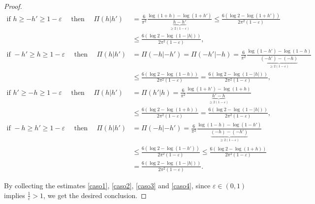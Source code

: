\documentclass[a4paper,10pt,reqno]{amsart}
\numberwithin{equation}{subsection}
\numberwithin{figure}{subsection}
\begin{document}
\begin{proof}
{\scriptsize\begin{align*}
\textrm{if }h\geq-h'\geq1-\varepsilon\quad\textrm{ then }\quad\Pi(h|h')&=\frac{6}{\pi^2}\frac{\log(1+h)-\log(1+h')}{\underbrace{h-h'}_{\geq2(1-\varepsilon)}}\leq\frac{6(\log 2-\log(1+h'))}{2\pi^2(1-\varepsilon)}
\\
&\leq\frac{6(\log 2-\log(1-|h|))}{2\pi^2(1-\varepsilon)},
\\
\textrm{if }-h'\geq h\geq1-\varepsilon\quad\textrm{ then }\quad\Pi(h|h')&=\Pi(-h|-h')=\Pi(-h'|-h)=\frac{6}{\pi^2}\frac{\log(1-h')-\log(1-h)}{\underbrace{(-h')-(-h)}_{\geq2(1-\varepsilon)}}
\\
&\leq\frac{6(\log 2-\log(1-h))}{2\pi^2(1-\varepsilon)}=\frac{6(\log 2-\log(1-|h|))}{2\pi^2(1-\varepsilon)},
\\
\textrm{if }h'\geq-h\geq1-\varepsilon\quad\textrm{ then }\quad\Pi(h|h')&=\Pi(h'|h)=\frac{6}{\pi^2}\frac{\log(1+h')-\log(1+h)}{\underbrace{h'-h}_{\geq2(1-\varepsilon)}}
\\
&\leq\frac{6(\log 2-\log(1+h))}{2\pi^2(1-\varepsilon)}=\frac{6(\log 2-\log(1-|h|))}{2\pi^2(1-\varepsilon)},
\\
\textrm{if }-h\geq h'\geq1-\varepsilon\quad\textrm{ then }\quad\Pi(h|h')&=\Pi(-h|-h')=\frac{6}{\pi^2}\frac{\log(1-h)-\log(1-h')}{\underbrace{(-h)-(-h')}_{\geq2(1-\varepsilon)}}
\\
&\leq\frac{6(\log 2-\log(1-h'))}{2\pi^2(1-\varepsilon)}\leq\frac{6(\log 2-\log(1+h))}{2\pi^2(1-\varepsilon)}\\
&=\frac{6(\log 2-\log(1-|h|))}{2\pi^2(1-\varepsilon)}.
\end{align*}}

By collecting the estimates \eqref{caso1}, \eqref{caso2}, \eqref{caso3} and \eqref{caso4}, since $\varepsilon\in(0,1)$ implies $\frac{1}{\varepsilon}>1$, we get the desired conclusion.
\end{proof}
\end{document}
